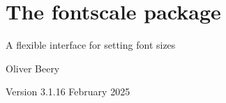 \documentclass{article}
\begin{document}
\section*{\Large The \textsf{fontscale} package}

A flexible interface for setting font sizes

Oliver Beery

Version 3.1.1\quad{}6 February 2025

\end{document}

